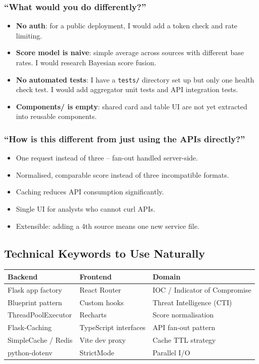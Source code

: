 \documentclass[11pt,a4paper]{article}
\begin{document}
\subsubsection{``What would you do differently?''}
\begin{itemize}
  \item \textbf{No auth}: for a public deployment, I would add a token check and rate limiting.
  \item \textbf{Score model is naive}: simple average across sources with different base rates. I would research Bayesian score fusion.
  \item \textbf{No automated tests}: I have a \texttt{tests/} directory set up but only one health check test. I would add aggregator unit tests and API integration tests.
  \item \textbf{Components/ is empty}: shared card and table UI are not yet extracted into reusable components.
\end{itemize}

\subsubsection{``How is this different from just using the APIs directly?''}
\begin{itemize}
  \item One request instead of three -- fan-out handled server-side.
  \item Normalised, comparable score instead of three incompatible formats.
  \item Caching reduces API consumption significantly.
  \item Single UI for analysts who cannot curl APIs.
  \item Extensible: adding a 4th source means one new service file.
\end{itemize}

\subsection{Technical Keywords to Use Naturally}

\begin{tabular}{lll}
\toprule
\textbf{Backend} & \textbf{Frontend} & \textbf{Domain} \\
\midrule
Flask app factory & React Router & IOC / Indicator of Compromise \\
Blueprint pattern & Custom hooks & Threat Intelligence (CTI) \\
ThreadPoolExecutor & Recharts & Score normalisation \\
Flask-Caching & TypeScript interfaces & API fan-out pattern \\
SimpleCache / Redis & Vite dev proxy & Cache TTL strategy \\
python-dotenv & StrictMode & Parallel I/O \\
\bottomrule
\end{tabular}
\end{document}
